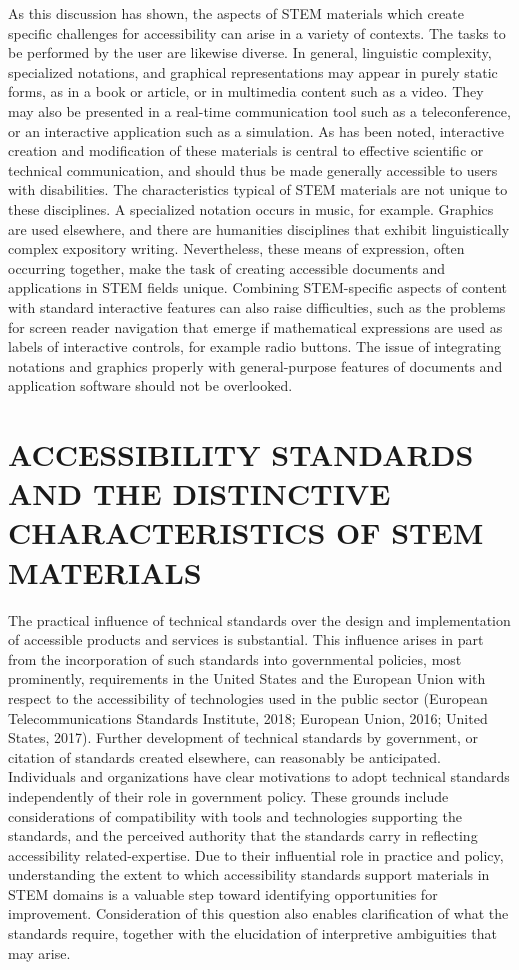 \documentclass{sig-alternate} %
\begin{document}
\begin{large}
As this discussion has shown, the aspects of STEM materials which create specific challenges for accessibility can arise in a variety of contexts. The tasks to be performed by the user are likewise diverse. In general, linguistic complexity, specialized notations, and graphical representations may appear in purely static forms, as in a book or article, or in multimedia content such as a video. They may also be presented in a real-time communication tool such as a teleconference, or an interactive application such as a simulation. As has been noted, interactive creation and modification of these materials is central to effective scientific or technical communication, and should thus be made generally accessible to users with disabilities. The characteristics typical of STEM materials are not unique to these disciplines. A specialized notation occurs in music, for example. Graphics are used elsewhere, and there are humanities disciplines that exhibit linguistically complex expository writing. Nevertheless, these means of expression, often occurring together, make the task of creating accessible documents and applications in STEM fields unique. Combining STEM-specific aspects of content with standard interactive features can also raise difficulties, such as the problems for screen reader navigation that emerge if mathematical expressions are used as labels of interactive controls, for example radio buttons. The issue of integrating notations and graphics properly with general-purpose features of documents and application software should not be overlooked.

\section*{ACCESSIBILITY STANDARDS AND THE DISTINCTIVE CHARACTERISTICS OF STEM MATERIALS}

The practical influence of technical standards over the design and implementation of accessible products and services is substantial. This influence arises in part from the incorporation of such standards into governmental policies, most prominently, requirements in the United States and the European Union with respect to the accessibility of technologies used in the public sector (European Telecommunications Standards Institute, 2018; European Union, 2016; United States, 2017). Further development of technical standards by government, or citation of standards created elsewhere, can reasonably be anticipated. Individuals and organizations have clear motivations to adopt technical standards independently of their role in government policy. These grounds include considerations of compatibility with tools and technologies supporting the standards, and the perceived authority that the standards carry in reflecting accessibility related-expertise. Due to their influential role in practice and policy, understanding the extent to which accessibility standards support materials in STEM domains is a valuable step toward identifying opportunities for improvement. Consideration of this question also enables clarification of what the standards require, together with the elucidation of interpretive ambiguities that may arise.


\end{large}
\end{document}
